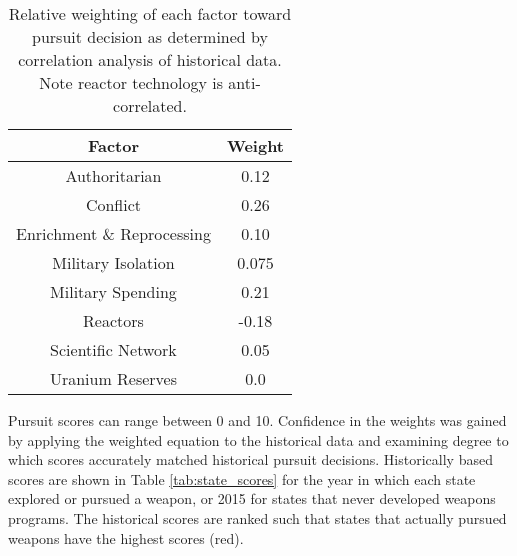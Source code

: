 \begin{table}
\centering
\begin{tabular}{|c|c|}
\hline
\textbf{Factor}        & \textbf{Weight} \\
\hline
Authoritarian   & 0.12 \\
Conflict  & 0.26 \\
Enrichment \& Reprocessing & 0.10 \\
Military Isolation & 0.075 \\
Military Spending & 0.21 \\
Reactors           & -0.18 \\
Scientific Network & 0.05 \\
Uranium Reserves &  0.0 \\
\hline
\end{tabular}
\caption{Relative weighting of each factor toward pursuit decision as determined by correlation analysis of historical data. Note reactor technology is anti-correlated.}
\label{tab:factor_weights}
\end{table}

Pursuit scores can range between 0 and 10.  Confidence in the weights was gained by applying the weighted equation to the historical data and examining degree to which scores accurately matched historical pursuit decisions.  Historically based scores are shown in Table \ref{tab:state_scores} for the year in which each state explored or pursued a weapon, or 2015 for states that never developed weapons programs. The historical scores are ranked such that states that actually pursued weapons have the highest scores (red).

